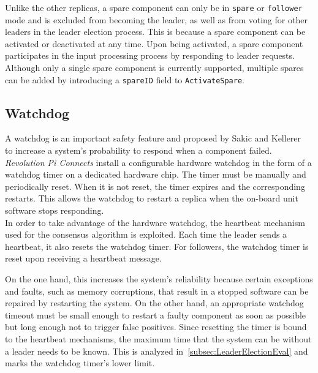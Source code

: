 Unlike the other replicas, a spare component can only be in \texttt{spare} or \texttt{follower} mode and is excluded from becoming the leader, as well as from voting for other leaders in the leader election process.
This is because a spare component can be activated or deactivated at any time.
Upon being activated, a spare component participates in the input processing process by responding to leader requests.
\\

Although only a single spare component is currently supported, multiple spares can be added by introducing a \texttt{spareID} field to \texttt{ActivateSpare}.

\subsection{Watchdog}

A watchdog is an important safety feature and proposed by Sakic and Kellerer~\cite{SakicTimeInConsensus} to increase a system's probability to respond when a component failed.
\textit{Revolution Pi Connects} install a configurable hardware watchdog in the form of a watchdog timer on a dedicated hardware chip.
The timer must be manually and periodically reset.
When it is not reset, the timer expires and the corresponding  restarts.
This allows the watchdog to restart a replica when the on-board unit software stops responding.
\\

In order to take advantage of the hardware watchdog, the heartbeat mechanism used for the consensus algorithm is exploited.
Each time the leader sends a heartbeat, it also resets the watchdog timer.
For followers, the watchdog timer is reset upon receiving a heartbeat message.

On the one hand, this increases the system's reliability because certain exceptions and faults, such as memory corruptions, that result in a stopped software can be repaired by restarting the system.
On the other hand, an appropriate watchdog timeout must be small enough to restart a faulty component as soon as possible but long enough not to trigger false positives.
Since resetting the timer is bound to the heartbeat mechanisms, the maximum time that the system can be without a leader needs to be known.
This is analyzed in~\autoref{subsec:LeaderElectionEval} and marks the watchdog timer's lower limit.


\iffalse






